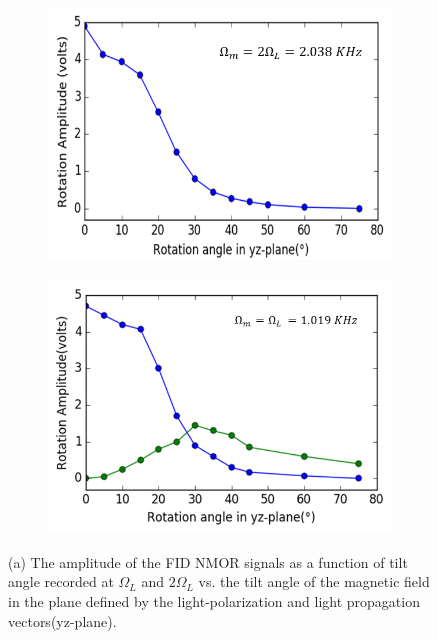 \begin{figure}
    \centering
   \begin{subfigure}[b]{0.45\textwidth}
        \centering
        \includegraphics[width=\textwidth]{figures/tilt_y_larmor.png}
        \caption{}
        \label{fig:tilt_y}
    \end{subfigure}
    \hfill
     \begin{subfigure}[b]{0.45\textwidth}
        \centering
        \includegraphics[width=\textwidth]{figures/tilt_y_2larmor.png}
        \caption{}
        \label{fig:tilt_x}
    \end{subfigure}
    \caption{(a) The amplitude of the FID NMOR signals as a function
      of tilt angle recorded at $\Omega_L$ and $2\Omega_L$ vs. the
      tilt angle of the magnetic field in the plane defined by the
      light-polarization and light propagation vectors(yz-plane). \label{fig:something-tilted}}
\end{figure}

